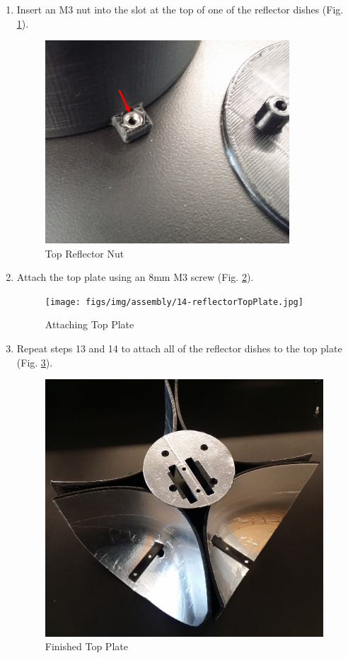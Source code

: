 \begin{enumerate}[label = \textbf{Step \arabic*.}]
    \item Insert an M3 nut into the slot at the top of one of the reflector dishes (Fig. \ref{fig:reflectorTopNut}).
    \begin{figure}[H]
        \centering
        \includegraphics[width=3.6in]{figs/img/assembly/13-reflectorTopNut.png}
        \caption{Top Reflector Nut}
        \label{fig:reflectorTopNut}
    \end{figure}
    \pagebreak

    \item Attach the top plate using an 8mm M3 screw (Fig. \ref{fig:reflectorTopPlate}).
    \begin{figure}[H]
        \centering
        \texttt{[image: figs/img/assembly/14-reflectorTopPlate.jpg]}
        \caption{Attaching Top Plate}
        \label{fig:reflectorTopPlate}
    \end{figure}

    \item Repeat steps 13 and 14 to attach all of the reflector dishes to the top plate (Fig. \ref{fig:finishedTopPlate}).
    \begin{figure}[H]
        \centering
        \includegraphics[width=4.1in]{figs/img/assembly/15-finishedReflectorTopPlate.jpg}
        \caption{Finished Top Plate}
        \label{fig:finishedTopPlate}
    \end{figure}
    \pagebreak


\end{enumerate}
